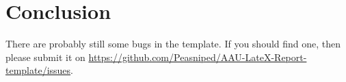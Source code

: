 \chapter{Conclusion}\label{ch:conclusion}

There are probably still some bugs in the template. If you should find one, then please submit it on \url{https://github.com/Peasniped/AAU-LateX-Report-template/issues}.